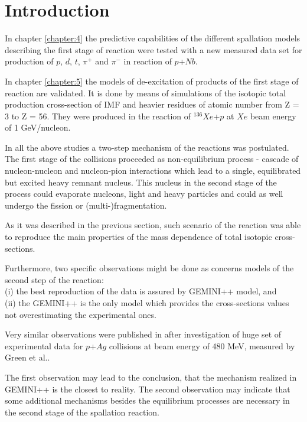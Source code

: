\section{Introduction}
In chapter \ref{chapter:4} the predictive capabilities of the different spallation models describing the first stage of reaction were tested with a new measured data set for production of $p$, $d$, $t$, $\pi^{+}$ and $\pi^{-}$ in reaction of $p$+$Nb$. 
 
In chapter \ref{chapter:5} the models of de-excitation of products of the first stage of reaction are validated. It is done by means of  
simulations of the isotopic total production cross-section of IMF and heavier residues of atomic number from Z = 3 to Z = 56. They were  produced in the reaction of $^{136}Xe$+$p$ at $Xe$ beam energy of 1 GeV/nucleon.

In all the above studies a two-step mechanism of the reactions was postulated.  The first stage of the collisions proceeded as non-equilibrium process - cascade of nucleon-nucleon and nucleon-pion interactions which lead to a single, equilibrated but excited heavy remnant nucleus.  
This nucleus in the second stage of the process could evaporate nucleons, light and heavy particles and could as well undergo the fission or (multi-)fragmentation.  

As it was described in the previous section, such scenario of the reaction was able to reproduce the main properties of the mass dependence of total isotopic cross-sections. 

Furthermore, two specific observations might be done as concerns models of the second step of the reaction: \\
(i) the best  reproduction of the data is 
assured by GEMINI++ model, and \\
(ii) the GEMINI++ is the only model which provides the cross-sections values not overestimating the experimental ones. 

Very similar observations were published in  \cite{sharma2016ranking} after investigation of huge set of experimental data for $p$+$Ag$ collisions at beam energy of 480 MeV,
measured by Green et al.\cite{Green1984}.

The first observation may lead to the conclusion, that the mechanism realized in GEMINI++ is the closest to reality. The second observation may indicate that some additional mechanisms besides the equilibrium processes are necessary in the second stage of the spallation reaction.  

